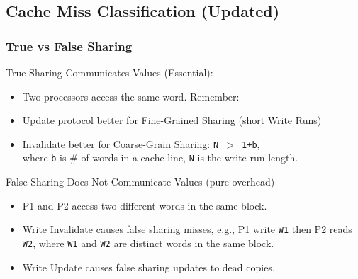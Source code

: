 \documentclass{beamer}
\renewcommand{\emph}[1]{\textcolor{structure}{#1}}
\newcommand{\emp}[1]{\textcolor{DikuRed}{ #1}}
\begin{document}
\subsection{Cache Miss Classification (Updated)}
\begin{frame}[fragile,t]
\frametitle{True vs False Sharing}

\emph{True Sharing Communicates Values (Essential):}
\begin{itemize} 
    \item Two processors access the same word. \emp{Remember:}
    \item Update protocol better for Fine-Grained Sharing (short Write Runs)
    \item Invalidate better for Coarse-Grain Sharing: {\tt N $>$ 1+b},\\
            where {\tt b} is \# of words in a cache line,
                    {\tt N} is the write-run length.
\end{itemize} 
\bigskip

\alert{False Sharing Does Not Communicate Values (pure overhead)}
\begin{itemize}
    \item P1 and P2 access two different words in the same block.
    \item Write Invalidate causes false sharing misses, e.g., P1 write {\tt W1} then
            P2 reads {\tt W2}, where {\tt W1} and {\tt W2} are distinct words in the same block. 
    \item Write Update causes false sharing updates to dead copies.
\end{itemize}

\end{frame}
\end{document}
